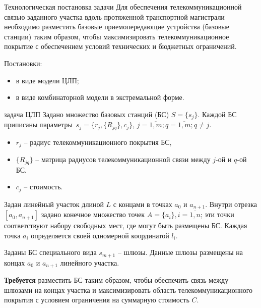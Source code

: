 \begin{frame}
    {Технологическая постановка задачи} 
    \justifying
    Для обеспечения телекоммуникационной связью заданного участка вдоль протяженной транспортной магистрали необходимо разместить базовые приемопередающие устройства (базовые станции) таким образом, чтобы максимизировать телекоммуникационное покрытие с обеспечением условий технических и бюджетных ограничений. 

    \bigskip
    
    Постановки:
    \begin{itemize}
        \item в виде модели ЦЛП;
        \item в виде комбинаторной модели в экстремальной форме.
    \end{itemize}

\end{frame}


\begin{frame}
    {задача ЦЛП}
    \justifying
    Задано множество базовых станций (БС) $S = \{s_j\}$. Каждой БС приписаны параметры $s_j = \{r_j, \{R_{jq}\}, c_j \}$, $j = \overline{1,m}; q = \overline{1,m}; q \neq j$. 
    \begin{itemize}
        \item $r_j$ -- радиус телекоммуникационного покрытия БС,
        \item $\{R_{jq} \}$ -- матрица радиусов телекоммуникационной связи между $j$-ой и $q$-ой БС.
        \item $c_j$ -- стоимость.
    \end{itemize} 
    

    Задан линейный участок длиной $L$ с концами в точках $a_0$ и $a_{n+1}$. Внутри  отрезка $[a_0, a_{n+1}]$ задано конечное множество точек $A=\{a_i\}, i=\overline{1,n}$; эти точки соответствуют набору свободных мест, где могут быть размещены БС. Каждая точка $a_i$ определяется своей одномерной координатой $l_i$. 
    
    \medskip
    
    Заданы БС специального вида $s_{m+1}$ -- шлюзы. Данные шлюзы размещены на концах $a_0$ и $a_{n+1}$ линейного участка. 
    \bigskip

    \textbf{Требуется} разместить  БС таким образом, чтобы обеспечить связь между шлюзами на концах участка и максимизировать область телекоммуникационного покрытия с условием ограничения на суммарную стоимость $C$.

\end{frame}

